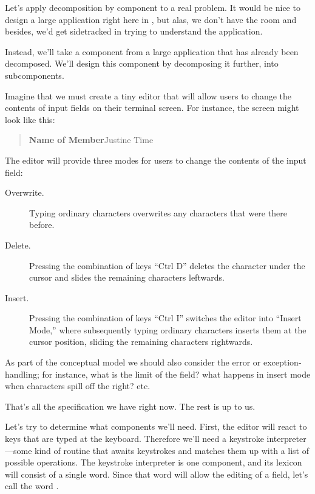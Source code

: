 Let's apply decomposition by component to a real problem. It would be
nice to design a large application right here in , but alas, we
don't have the room and besides, we'd get sidetracked in trying to
understand the application.

Instead, we'll take a component from a large application that has
already been decomposed. We'll design this component by decomposing it
further, into subcomponents.

Imagine that we must create a tiny editor that will allow users to
change the contents of input fields on their terminal screen. For instance,
the screen might look like this:

\begin{quote}
\textsf{\textbf{Name of Member}\quad Justine Time}
\end{quote}
The editor will provide three modes for users to change the contents of
the input field:

\begin{description}

\item[Overwrite.] Typing ordinary characters overwrites any characters
that were there before.

\item[Delete.] Pressing the combination of keys ``Ctrl D'' deletes the
character under the cursor and slides the remaining characters
leftwards.

\item[Insert.] Pressing the combination of keys ``Ctrl I'' switches the
editor into ``Insert Mode,'' where subsequently typing ordinary
characters inserts them at the cursor position, sliding the remaining
characters rightwards.

\end{description}
As part of the conceptual model we should also consider the error or
exception-handling; for instance, what is the limit of the field? what
happens in insert mode when characters spill off the right? etc.

That's all the specification we have right now. The rest is up to us.

Let's try to determine what components we'll need. First, the editor
will react to keys that are typed at the keyboard. Therefore we'll
need a keystroke interpreter---some kind of routine that awaits
keystrokes and matches them up with a list of possible operations. The
keystroke interpreter is one component, and its lexicon will consist
of a single word.  Since that word will allow the editing of a field,
let's call the word .

